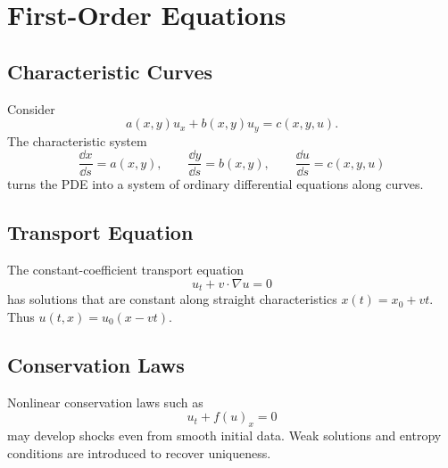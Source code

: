 
\chapter{First-Order Equations}

\section{Characteristic Curves}

Consider
\[
  a(x,y)u_x+b(x,y)u_y=c(x,y,u).
\]
The characteristic system
\[
  \frac{\dd x}{\dd s}=a(x,y),\qquad
  \frac{\dd y}{\dd s}=b(x,y),\qquad
  \frac{\dd u}{\dd s}=c(x,y,u)
\]
turns the PDE into a system of ordinary differential equations along curves.

\section{Transport Equation}

The constant-coefficient transport equation
\[
  u_t+v\cdot\nabla u=0
\]
has solutions that are constant along straight characteristics \(x(t)=x_0+vt\). Thus \(u(t,x)=u_0(x-vt)\).

\section{Conservation Laws}

Nonlinear conservation laws such as
\[
  u_t+f(u)_x=0
\]
may develop shocks even from smooth initial data. Weak solutions and entropy conditions are introduced to recover uniqueness.
